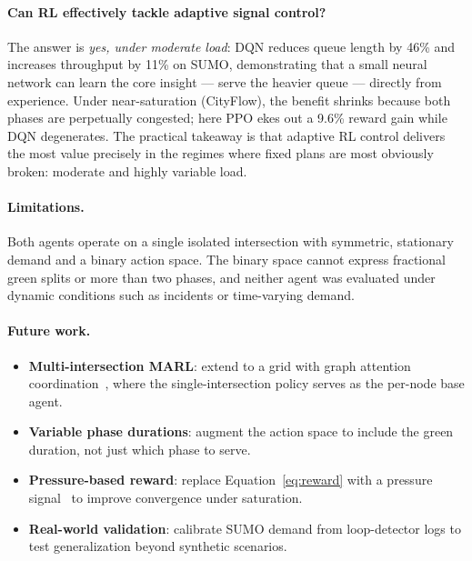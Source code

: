 \documentclass[twoside,11pt]{article}
\begin{document}
\paragraph{Can RL effectively tackle adaptive signal control?}
The answer is \emph{yes, under moderate load}: DQN reduces queue length by
46\% and increases throughput by 11\% on SUMO, demonstrating that a small
neural network can learn the core insight — serve the heavier queue — directly
from experience.  Under near-saturation (CityFlow), the benefit shrinks because
both phases are perpetually congested; here PPO ekes out a 9.6\% reward gain
while DQN degenerates.  The practical takeaway is that adaptive RL control
delivers the most value precisely in the regimes where fixed plans are most
obviously broken: moderate and highly variable load.

\paragraph{Limitations.}
Both agents operate on a single isolated intersection with symmetric, stationary
demand and a binary action space.  The binary space cannot express fractional
green splits or more than two phases, and neither agent was evaluated under
dynamic conditions such as incidents or time-varying demand.

\paragraph{Future work.}
\begin{itemize}
  \item \textbf{Multi-intersection MARL}: extend to a grid with graph
        attention coordination~\citep{wei2019colight}, where the single-intersection
        policy serves as the per-node base agent.
  \item \textbf{Variable phase durations}: augment the action space to include
        the green duration, not just which phase to serve.
  \item \textbf{Pressure-based reward}: replace Equation~\ref{eq:reward} with
        a pressure signal~\citep{wei2019presslight} to improve convergence under
        saturation.
  \item \textbf{Real-world validation}: calibrate SUMO demand from loop-detector
        logs to test generalization beyond synthetic scenarios.
\end{itemize}



\end{document}
